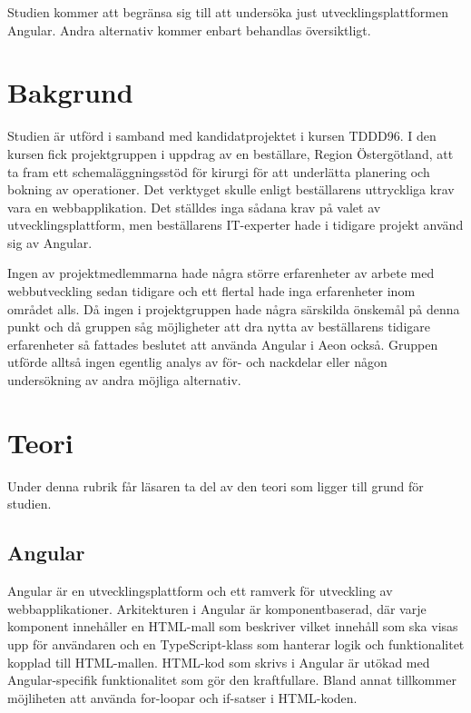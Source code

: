 Studien kommer att begränsa sig till att undersöka just utvecklingsplattformen Angular. Andra alternativ kommer enbart behandlas översiktligt.

\section{Bakgrund}


Studien är utförd i samband med kandidatprojektet i kursen TDDD96. I den kursen fick projektgruppen i uppdrag av en beställare, Region Östergötland, att ta fram ett schemaläggningsstöd för kirurgi för att underlätta planering och bokning av operationer. Det verktyget skulle enligt beställarens uttryckliga krav vara en webbapplikation. Det ställdes inga sådana krav på valet av utvecklingsplattform, men beställarens IT-experter hade i tidigare projekt använd sig av Angular. 

Ingen av projektmedlemmarna hade några större erfarenheter av arbete med webbutveckling sedan tidigare och ett flertal hade inga erfarenheter inom området alls. Då ingen i projektgruppen hade några särskilda önskemål på denna punkt och då gruppen såg möjligheter att dra nytta av beställarens tidigare erfarenheter så fattades beslutet att använda Angular i Aeon också. Gruppen utförde alltså ingen egentlig analys av för- och nackdelar eller någon undersökning av andra möjliga alternativ.  

\section{Teori}

Under denna rubrik får läsaren ta del av den teori som ligger till grund för studien.

\subsection{Angular} \label{martin_angular}

Angular är en utvecklingsplattform och ett ramverk för utveckling av webbapplikationer. Arkitekturen i Angular är komponentbaserad, där varje komponent innehåller en HTML-mall som beskriver vilket innehåll som ska visas upp för användaren och en TypeScript-klass som hanterar logik och funktionalitet kopplad till HTML-mallen. HTML-kod som skrivs i Angular är utökad med Angular-specifik funktionalitet som gör den kraftfullare. Bland annat tillkommer möjliheten att använda for-loopar och if-satser i HTML-koden.

